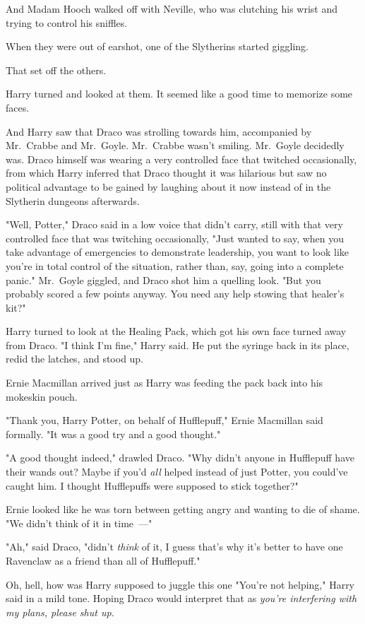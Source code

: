 And Madam Hooch walked off with Neville, who was clutching his wrist and trying
to control his sniffles.

When they were out of earshot, one of the Slytherins started giggling.

That set off the others.

Harry turned and looked at them. It seemed like a good time to memorize some
faces.

And Harry saw that Draco was strolling towards him, accompanied by Mr.~Crabbe
and Mr.~Goyle. Mr.~Crabbe wasn't smiling. Mr.~Goyle decidedly was. Draco
himself was wearing a very controlled face that twitched occasionally, from
which Harry inferred that Draco thought it was hilarious but saw no political
advantage to be gained by laughing about it now instead of in the Slytherin
dungeons afterwards.

"Well, Potter," Draco said in a low voice that didn't carry, still with that
very controlled face that was twitching occasionally, "Just wanted to say, when
you take advantage of emergencies to demonstrate leadership, you want to look
like you're in total control of the situation, rather than, say, going into a
complete panic." Mr.~Goyle giggled, and Draco shot him a quelling look. "But
you probably scored a few points anyway. You need any help stowing that
healer's kit?"

Harry turned to look at the Healing Pack, which got his own face turned away
from Draco. "I think I'm fine," Harry said. He put the syringe back in its
place, redid the latches, and stood up.

Ernie Macmillan arrived just as Harry was feeding the pack back into his
mokeskin pouch.

"Thank you, Harry Potter, on behalf of Hufflepuff," Ernie Macmillan said
formally. "It was a good try and a good thought."

"A good thought indeed," drawled Draco. "Why didn't anyone in Hufflepuff have
their wands out? Maybe if you'd \emph{all} helped instead of just Potter, you
could've caught him. I thought Hufflepuffs were supposed to stick together?"

Ernie looked like he was torn between getting angry and wanting to die of
shame. "We didn't think of it in time~---"

"Ah," said Draco, "didn't \emph{think} of it, I guess that's why it's better to
have one Ravenclaw as a friend than all of Hufflepuff."

Oh, hell, how was Harry supposed to juggle this one{\el} "You're not
helping," Harry said in a mild tone. Hoping Draco would interpret that as
\emph{you're interfering with my plans, please shut up.}

